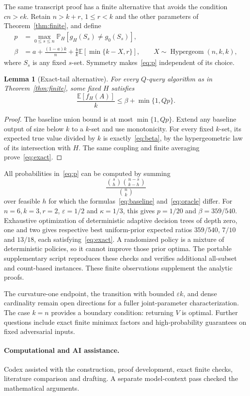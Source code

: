 \documentclass[manuscript,11pt,screen,nonacm]{acmart}
\newcommand{\E}{\mathbb E}
\newcommand{\eps}{\varepsilon}
\newtheorem{lemma}[theorem]{Lemma}
\newcommand{\Prb}{\mathbb P}
\begin{document}
The same transcript proof has a finite alternative that avoids the
condition $cn>e k$. Retain $n>k+r$, $1\le r<k$ and the other
parameters of Theorem~\ref{thm:finite}, and define
\begin{align}
 p&=\max_{0\le s\le n}
       \Prb_H[g_H(S_s)\ne g_0(S_s)],\label{eq:p}\\
 \beta&=a+\frac{(1-a)k}{n}
              +\frac b k\E[\min\{k-X,r\}],\qquad
 X\sim\operatorname{Hypergeom}(n,k,k),\label{eq:beta}
\end{align}
where $S_s$ is any fixed $s$-set. Symmetry makes~\eqref{eq:p}
independent of its choice.

\begin{lemma}[Exact-tail alternative]\label{lem:exact}
For every $Q$-query algorithm as in Theorem~\ref{thm:finite}, some
fixed $H$ satisfies
\begin{equation}\label{eq:exact}
 \frac{\E[f_H(A)]}{k}\le\beta+\min\{1,Qp\}.
\end{equation}
\end{lemma}
\begin{proof}
The baseline union bound is at most $\min\{1,Qp\}$. Extend any
baseline output of size below $k$ to a $k$-set and use monotonicity.
For every fixed $k$-set, its expected true value divided by $k$ is
exactly~\eqref{eq:beta}, by the hypergeometric law of its intersection
with $H$. The same coupling and finite averaging prove~\eqref{eq:exact}.
\end{proof}

All probabilities in~\eqref{eq:p} can be computed by summing
\[
 \frac{\binom{s}{h}\binom{n-s}{k-h}}{\binom{n}{k}}
\]
over feasible $h$ for which the formulas~\eqref{eq:baseline}
and~\eqref{eq:oracle} differ. For $n=6,k=3,r=2$, $\eps=1/2$ and
$\kappa=1/3$, this gives $p=1/20$ and $\beta=359/540$.
Exhaustive optimization of deterministic adaptive decision trees of
depth zero, one and two gives respective best uniform-prior expected
ratios $359/540$, $7/10$ and $13/18$, each satisfying~\eqref{eq:exact}.
A randomized policy is a mixture of deterministic policies, so it cannot
improve those prior optima. The portable supplementary script reproduces
these checks and verifies additional all-subset and count-based instances.
These finite observations supplement the analytic proofs.

The curvature-one endpoint, the transition with bounded $\eps k$,
and dense cardinality remain open directions for a fuller joint-parameter
characterization. The case $k=n$ provides a boundary condition: returning
$V$ is optimal. Further questions include exact finite minimax factors
and high-probability guarantees on fixed adversarial inputs.

\paragraph{Computational and AI assistance.}
Codex assisted with the construction, proof development, exact finite checks,
literature comparison and drafting. A separate model-context pass checked
the mathematical arguments.



\clearpage
\onehalfspacing
\end{document}
